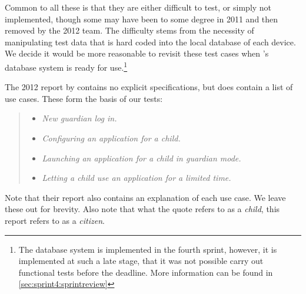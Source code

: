 Common to all these is that they are either difficult to test, or simply not implemented, though some may have been to some degree in 2011 and then removed by the 2012 team.
The difficulty stems from the necessity of manipulating test data that is hard coded into the local database of each device. 
We decide it would be more reasonable to revisit these test cases when \giraf's database system is ready for use.\footnote{The database system is implemented in the fourth sprint, however, it is implemented at such a late stage, that it was not possible carry out functional tests before the deadline. More information can be found in \cref{sec:sprint4:sprintreview}}

The 2012 report by \citet{launcher2012} contains no explicit specifications, but does contain a list of use cases. 
These form the basis of our tests:

\begin{quote}
\begin{itemize}
	\item \textit{New guardian log in.}
	\item \textit{Configuring an application for a child.}
	\item \textit{Launching an application for a child in guardian mode.}
	\item \textit{Letting a child use an application for a limited time.}
\end{itemize}
\end{quote}

Note that their report also contains an explanation of each use case. 
We leave these out for brevity.
Also note that what the quote refers to as a \textit{child}, this report refers to as a \textit{citizen}.